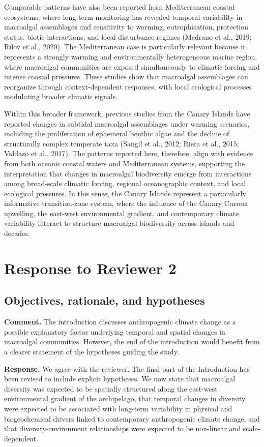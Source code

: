 \documentclass[12pt]{article}
\newcommand{\reviewercomment}[1]{%
\vspace{0.3em}
\noindent\textbf{Comment.} \textcolor{commentblue}{#1}\par
}
\newcommand{\authorresponse}[1]{%
\vspace{0.3em}
\noindent\textbf{Response.} \textcolor{responsegreen}{#1}\par
\vspace{0.8em}
}
\begin{document}
Comparable patterns have also been reported from Mediterranean coastal ecosystems, where long-term monitoring has revealed temporal variability in macroalgal assemblages and sensitivity to warming, eutrophication, protection status, biotic interactions, and local disturbance regimes (Medrano et al., 2019; Rilov et al., 2020). The Mediterranean case is particularly relevant because it represents a strongly warming and environmentally heterogeneous marine region, where macroalgal communities are exposed simultaneously to climatic forcing and intense coastal pressures. These studies show that macroalgal assemblages can reorganize through context-dependent responses, with local ecological processes modulating broader climatic signals.

Within this broader framework, previous studies from the Canary Islands have reported changes in subtidal macroalgal assemblages under warming scenarios, including the proliferation of ephemeral benthic algae and the decline of structurally complex temperate taxa (Sangil et al., 2012; Riera et al., 2015; Valdazo et al., 2017). The patterns reported here, therefore, align with evidence from both oceanic coastal waters and Mediterranean systems, supporting the interpretation that changes in macroalgal biodiversity emerge from interactions among broad-scale climatic forcing, regional oceanographic context, and local ecological pressures. In this sense, the Canary Islands represent a particularly informative transition-zone system, where the influence of the Canary Current upwelling, the east-west environmental gradient, and contemporary climate variability interact to structure macroalgal biodiversity across islands and decades. 

\section{Response to Reviewer 2}

\subsection{Objectives, rationale, and hypotheses}

\reviewercomment{The introduction discusses anthropogenic climate change as a possible explanatory factor underlying temporal and spatial changes in macroalgal communities. However, the end of the introduction would benefit from a clearer statement of the hypotheses guiding the study.}

\authorresponse{We agree with the reviewer. The final part of the Introduction has been revised to include explicit hypotheses. We now state that macroalgal diversity was expected to be spatially structured along the east-west environmental gradient of the archipelago, that temporal changes in diversity were expected to be associated with long-term variability in physical and biogeochemical drivers linked to contemporary anthropogenic climate change, and that diversity-environment relationships were expected to be non-linear and scale-dependent.}
\end{document}
